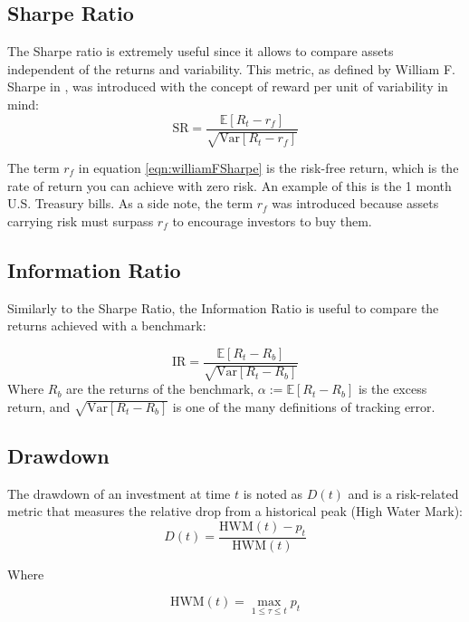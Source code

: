 \subsection*{Sharpe Ratio}
The Sharpe ratio is extremely useful since it allows to compare assets 
independent of the returns and variability. This metric, as defined by 
William F. Sharpe in \cite{sharpe1994sharpe}, was introduced with the
concept of reward per unit of variability in mind:
\begin{equation}
	\label{eqn:williamFSharpe}
	\text{SR} = \frac{\mathbb{E}[R_t - r_f]}{\sqrt{\text{Var}[R_t - r_f]}}
\end{equation}

The term $r_f$ in equation \ref{eqn:williamFSharpe} is the risk-free return, 
which is the rate of return you can achieve with zero risk. An example of 
this is the 1 month U.S. Treasury bills. As a side note, the term $r_f$ was 
introduced because assets carrying risk must surpass $r_f$ to encourage 
investors to buy them.

\subsection*{Information Ratio}
Similarly to the Sharpe Ratio, the Information Ratio is useful to compare 
the returns achieved with a benchmark:

\begin{equation*}
	\label{eqn:informationRatio}
	\text{IR} = \frac{\mathbb{E}[R_t - R_b]}{\sqrt{\text{Var}[R_t - R_b]}}
\end{equation*}
Where $R_b$ are the returns of the benchmark, $\alpha := \mathbb{E}[R_t - 
R_b]$ is the excess return, and $\sqrt{\text{Var}[R_t - R_b]}$ is one of the 
many definitions of tracking error.

\subsection*{Drawdown}
The drawdown of an investment at time $t$ is noted as $D(t)$ and is a 
risk-related metric that measures the relative drop from a historical peak 
(High Water Mark):
\begin{equation*}
	D(t) = \frac{\text{HWM}(t) - p_t}{\text{HWM}(t)}
\end{equation*}

Where 

\begin{equation*}
	\text{HWM}(t) = \max_{1 \leq \tau \leq t} p_t
\end{equation*}

